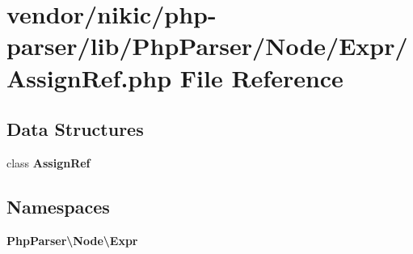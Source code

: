 \section{vendor/nikic/php-\/parser/lib/\+Php\+Parser/\+Node/\+Expr/\+Assign\+Ref.php File Reference}
\label{_assign_ref_8php}
\subsection*{Data Structures}
\begin{DoxyCompactItemize}
\item 
class {\bf Assign\+Ref}
\end{DoxyCompactItemize}
\subsection*{Namespaces}
\begin{DoxyCompactItemize}
\item 
 {\bf Php\+Parser\textbackslash{}\+Node\textbackslash{}\+Expr}
\end{DoxyCompactItemize}
